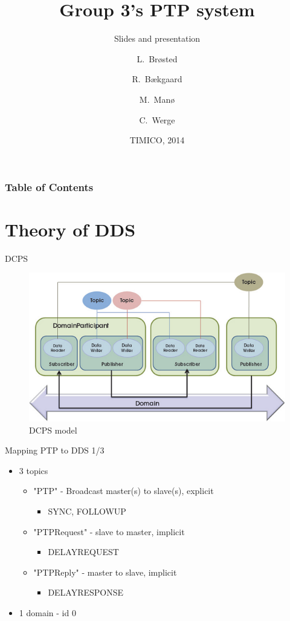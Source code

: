 \documentclass[compressed, presentation, notheorems, 12pt]{beamer}
\title{Group 3's PTP system}
\subtitle{Slides and presentation}
\author[Author, Anders] %
{L.~Brøsted \and R.~Bækgaard \and M.~Manø \and C.~Werge}
\institute
{
  Aarhus University \\
  School of Engineering
}
\date{TIMICO, 2014}
\begin{document}
 	\frame{\titlepage}

\begin{frame}
\frametitle{Table of Contents}
\tableofcontents%
\end{frame}

\section{Theory of DDS}

\begin{frame}{DCPS}

\begin{figure}[hbtp]
\centering
\includegraphics[width =0.9 \textwidth]{RTI_EntityOverview_small}
\caption{DCPS model}
\end{figure}


\end{frame}


\begin{frame}{Mapping PTP to DDS 1/3}
\begin{itemize}
	\item 3 topics
	\begin{itemize}
		\item "PTP" - Broadcast master(s) to slave(s), explicit
		\begin{itemize}
			\item SYNC, FOLLOWUP
		\end{itemize}
		\item "PTPRequest" - slave to master, implicit
		\begin{itemize}
			\item DELAYREQUEST
		\end{itemize}
		\item "PTPReply" - master to slave, implicit
		\begin{itemize}
		 	\item DELAYRESPONSE
		 \end{itemize} 
	\end{itemize}

	\item  1 domain - id 0
\end{itemize}
\end{frame}
\end{document}
